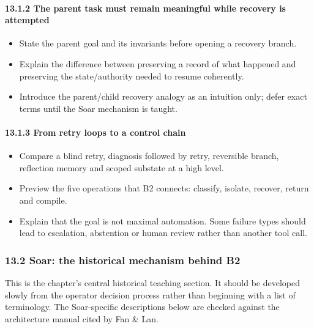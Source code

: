 \paragraph{13.1.2 The parent task must remain meaningful while recovery is attempted}\label{the-parent-task-must-remain-meaningful-while-recovery-is-attempted}

\begin{itemize}
\tightlist
\item
  State the parent goal and its invariants before opening a recovery branch.
\item
  Explain the difference between preserving a record of what happened and preserving the state/authority needed to resume coherently.
\item
  Introduce the parent/child recovery analogy as an intuition only; defer exact terms until the Soar mechanism is taught.
\end{itemize}

\paragraph{13.1.3 From retry loops to a control chain}\label{from-retry-loops-to-a-control-chain}

\begin{itemize}
\tightlist
\item
  Compare a blind retry, diagnosis followed by retry, reversible branch, reflection memory and scoped substate at a high level.
\item
  Preview the five operations that B2 connects: classify, isolate, recover, return and compile.
\item
  Explain that the goal is not maximal automation. Some failure types should lead to escalation, abstention or human review rather than another tool call.
\end{itemize}

\subsubsection{13.2 Soar: the historical mechanism behind B2}\label{soar-the-historical-mechanism-behind-b2}

This is the chapter's central historical teaching section. It should be developed slowly from the operator decision process rather than beginning with a list of terminology. The Soar-specific descriptions below are checked against the architecture manual cited by Fan \& Lan.\autocite{soar2025architecture}

